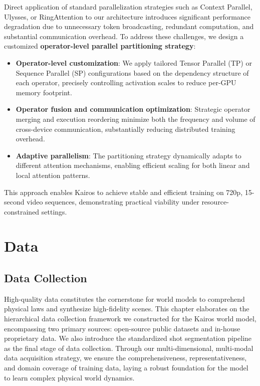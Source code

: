\documentclass{llmxive}
\begin{document}
Direct application of standard parallelization strategies such as Context Parallel, Ulysses, or RingAttention to our architecture introduces significant performance degradation due to unnecessary token broadcasting, redundant computation, and substantial communication overhead. To address these challenges, we design a customized \textbf{operator-level parallel partitioning strategy}:
\begin{itemize}
    \item \textbf{Operator-level customization}: We apply tailored Tensor Parallel (TP) or Sequence Parallel (SP) configurations based on the dependency structure of each operator, precisely controlling activation scales to reduce per-GPU memory footprint.
    \item \textbf{Operator fusion and communication optimization}: Strategic operator merging and execution reordering minimize both the frequency and volume of cross-device communication, substantially reducing distributed training overhead.
    \item \textbf{Adaptive parallelism}: The partitioning strategy dynamically adapts to different attention mechanisms, enabling efficient scaling for both linear and local attention patterns.
\end{itemize}

This approach enables Kairos to achieve stable and efficient training on 720p, 15-second video sequences, demonstrating practical viability under resource-constrained settings.



\section{Data}



\subsection{Data Collection}


High-quality data constitutes the cornerstone for world models to comprehend physical laws and synthesize high-fidelity scenes. This chapter elaborates on the hierarchical data collection framework we constructed for the Kairos world model, encompassing two primary sources: open-source public datasets and in-house proprietary data. We also introduce the standardized shot segmentation pipeline as the final stage of data collection. Through our multi-dimensional, multi-modal data acquisition strategy, we ensure the comprehensiveness, representativeness, and domain coverage of training data, laying a robust foundation for the model to learn complex physical world dynamics.
\end{document}
